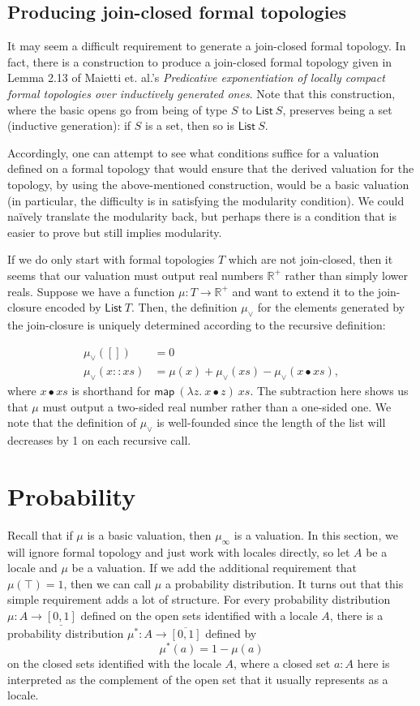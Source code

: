 \documentclass{article}           %
\newcommand{\R}{\mathbb{R}}
\newcommand{\List}[1]{\mathsf{List}\ {#1}}
\newcommand{\map}[2]{\mathsf{map}\ {#1}\ {#2}}
\newcommand{\fun}[2]{\lambda {#1}.\  {#2}}
\begin{document}
\subsection{Producing join-closed formal topologies}

It may seem a difficult requirement to generate a join-closed formal topology. In fact, there is a construction to produce a join-closed formal topology given in Lemma 2.13 of Maietti et. al.'s \emph{Predicative exponentiation of locally compact formal topologies over inductively generated ones}. Note that this construction, where the basic opens go from being of type $S$ to $\List{S}$, preserves being a set (inductive generation): if $S$ is a set, then so is $\List{S}$.

Accordingly, one can attempt to see what conditions suffice for a valuation defined on a formal topology that would ensure that the derived valuation for the topology, by using the above-mentioned construction, would be a basic valuation (in particular, the difficulty is in satisfying the modularity condition). We could na\"ively translate the modularity back, but perhaps there is a condition that is easier to prove but still implies modularity.


If we do only start with formal topologies $T$ which are not join-closed, then it seems that our valuation must output real numbers $\R^+$ rather than simply lower reals. Suppose we have a function $\mu : T \to \R^+$ and want to extend it to the join-closure encoded by $\List{T}$. Then, the definition $\mu_\vee$ for the elements generated by the join-closure is uniquely determined according to the recursive definition:

\begin{align*}
\mu_\vee([]) &= 0
\\ \mu_\vee(x :: xs) &= \mu(x) + \mu_\vee(xs) - \mu_\vee(x \bullet xs),
\end{align*}
where $x \bullet xs$ is shorthand for $\map{(\fun{z}{x \bullet z})}{xs}$. The subtraction here shows us that $\mu$ must output a two-sided real number rather than a one-sided one. We note that the definition of $\mu_\vee$ is well-founded since the length of the list will decreases by 1 on each recursive call.

\section{Probability}

Recall that if $\mu$ is a basic valuation, then $\mu_\infty$ is a valuation. In this section, we will ignore formal topology and just work with locales directly, so let $A$ be a locale and $\mu$ be a valuation. If we add the additional requirement that $\mu(\top) = 1$, then we can call $\mu$ a probability distribution. It turns out that this simple requirement adds a lot of structure. For every probability distribution $\mu : A \to \underline{[0,1]}$ defined on the open sets identified with a locale $A$, there is a probability distribution $\mu^* : A \to \overline{[0,1]}$ defined by
\[
\mu^*(a) = 1 - \mu(a)
\]
on the closed sets identified with the locale $A$, where a closed set $a : A$ here is interpreted as the complement of the open set that it usually represents as a locale.
\end{document}
